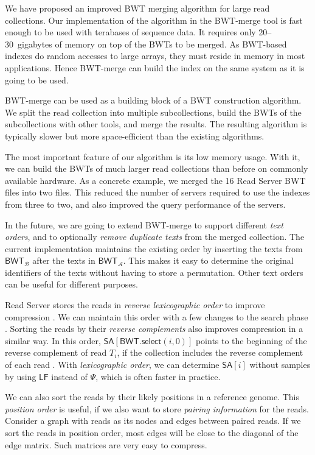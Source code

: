 \documentclass[smallabstract,smallcaptions]{dccpaper}
\newcommand{\BWT}{\textsf{BWT}}
\newcommand{\mSA}{\ensuremath{\mathsf{SA}}}
\newcommand{\mBWT}{\ensuremath{\mathsf{BWT}}}
\newcommand{\mLF}{\ensuremath{\mathsf{LF}}}
\newcommand{\mselect}{\ensuremath{\mathsf{select}}}
\newcommand{\Acoll}{\ensuremath{\mathcal{A}}}
\newcommand{\Bcoll}{\ensuremath{\mathcal{B}}}
\newcommand{\BWTmerge}{\textsf{BWT\nobreakdash-merge}}
\begin{document}
We have proposed an improved \BWT{} merging algorithm for large read collections. Our implementation of the algorithm in the \BWTmerge{} tool is fast enough to be used with terabases of sequence data. It requires only 20\nobreakdash--30~gigabytes of memory on top of the \BWT{}s to be merged. As \BWT-based indexes do random accesses to large arrays, they must reside in memory in most applications. Hence \BWTmerge{} can build the index on the same system as it is going to be used.

\BWTmerge{} can be used as a building block of a \BWT{} construction algorithm. We split the read collection into multiple subcollections, build the \BWT{}s of the subcollections with other tools, and merge the results. The resulting algorithm is typically slower but more space-efficient than the existing algorithms.

The most important feature of our algorithm is its low memory usage. With it, we can build the \BWT{}s of much larger read collections than before on commonly available hardware. As a concrete example, we merged the 16 Read Server \BWT{} files into two files. This reduced the number of servers required to use the indexes from three to two, and also improved the query performance of the servers.

In the future, we are going to extend \BWTmerge{} to support different \emph{text orders}, and to optionally \emph{remove duplicate texts} from the merged collection. The current implementation maintains the existing order by inserting the texts from $\mBWT_{\Bcoll}$ after the texts in $\mBWT_{\Acoll}$. This makes it easy to determine the original identifiers of the texts without having to store a permutation. Other text orders can be useful for different purposes.

Read Server stores the reads in \emph{reverse lexicographic order} to improve compression \cite{Cox2012}. We can maintain this order with a few changes to the search phase \cite{Li2014a}. Sorting the reads by their \emph{reverse complements} also improves compression in a similar way. In this order, $\mSA[\mBWT.\mselect(i,0)]$ points to the beginning of the reverse complement of read $T_{i}$, if the collection includes the reverse complement of each read \cite{Li2014a}. With \emph{lexicographic order}, we can determine $\mSA[i]$ without samples by using $\mLF$ instead of $\Psi$, which is often faster in practice.

We can also sort the reads by their likely positions in a reference genome. This \emph{position order} is useful, if we also want to store \emph{pairing information} for the reads. Consider a graph with reads as its nodes and edges between paired reads. If we sort the reads in position order, most edges will be close to the diagonal of the edge matrix. Such matrices are very easy to compress.




\end{document}
